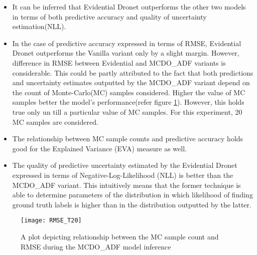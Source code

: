 \begin{itemize}
	\item It can be inferred that Evidential Dronet outperforms the other two models in terms of both predictive accuracy and quality of uncertainty estimation(NLL).
	\item In the case of predictive accuracy expressed in terms of RMSE, Evidential Dronet outperforms the Vanilla variant only by a slight margin. However, difference in RMSE between Evidential and MCDO\_ADF variants is considerable. This could be partly attributed to the fact that both predictions and uncertainty estimates outputted by the MCDO\_ADF variant depend on the count of Monte-Carlo(MC) samples considered. Higher the value of MC samples better the model's performance(refer figure \ref{fig_mc_count_vs_rmse}).  However, this holds true only un till a particular value of MC samples. For this experiment, 20 MC samples are considered. 
	\item The relationship between MC sample counts and predictive accuracy holds good for the Explained Variance (EVA) measure as well.
	\item The quality of predictive uncertainty estimated by the Evidential Dronet expressed in terms of Negative-Log-Likelihood (NLL) is better than the MCDO\_ADF variant. This intuitively means that the former technique is able to determine parameters of the distribution in which likelihood of finding ground truth labels is higher than in the distribution outputted by the latter.
\end{itemize}
\begin{figure}[h]
	\centering
	\texttt{[image: RMSE\_T20]}
	\caption{A plot depicting relationship between the MC sample count and RMSE during the MCDO\_ADF model inference}
	\label{fig_mc_count_vs_rmse}
\end{figure}

